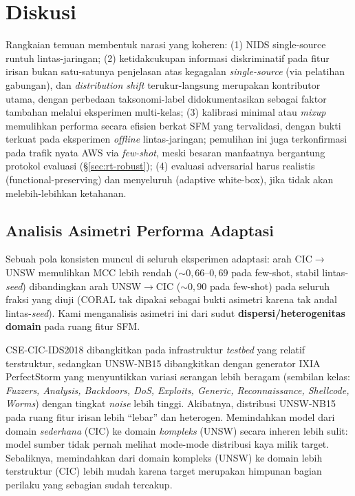 \documentclass[11pt,a4paper]{article}
\begin{document}
\section{Diskusi}
\label{sec:discussion}

Rangkaian temuan membentuk narasi yang koheren:
(1) NIDS single-source runtuh lintas-jaringan;
(2) ketidakcukupan informasi diskriminatif pada fitur irisan bukan satu-satunya
penjelasan atas kegagalan \emph{single-source} (via pelatihan gabungan), dan
\emph{distribution shift} terukur-langsung merupakan kontributor utama, dengan
perbedaan taksonomi-label didokumentasikan sebagai faktor tambahan melalui
eksperimen multi-kelas;
(3) kalibrasi minimal atau \emph{mixup} memulihkan performa secara efisien
berkat SFM yang tervalidasi, dengan bukti terkuat pada eksperimen \emph{offline}
lintas-jaringan; pemulihan ini juga terkonfirmasi pada trafik nyata AWS via
\emph{few-shot}, meski besaran manfaatnya bergantung protokol evaluasi
(\S\ref{sec:rt-robust})\ifadversarial;
(4) evaluasi adversarial harus realistis (functional-preserving) dan
menyeluruh (adaptive white-box), jika tidak akan melebih-lebihkan ketahanan\fi.

\subsection{Analisis Asimetri Performa Adaptasi}
\label{sec:asymmetry}
Sebuah pola konsisten muncul di seluruh eksperimen adaptasi: arah
CIC$\rightarrow$UNSW memulihkan MCC lebih rendah
($\sim 0{,}66$--$0{,}69$ pada few-shot, stabil lintas-\emph{seed}) dibandingkan arah
UNSW$\rightarrow$CIC ($\sim 0{,}90$ pada few-shot) pada seluruh fraksi yang diuji
(CORAL tak dipakai sebagai bukti asimetri karena tak andal lintas-\emph{seed}). Kami menganalisis asimetri ini dari sudut
\textbf{dispersi/heterogenitas domain} pada ruang fitur SFM.

CSE-CIC-IDS2018 dibangkitkan pada infrastruktur \emph{testbed} yang relatif
terstruktur, sedangkan UNSW-NB15 dibangkitkan dengan generator IXIA
PerfectStorm yang menyuntikkan variasi serangan lebih beragam
(sembilan kelas: \emph{Fuzzers, Analysis, Backdoors, DoS, Exploits, Generic,
Reconnaissance, Shellcode, Worms}) dengan tingkat \emph{noise} lebih tinggi.
Akibatnya, distribusi UNSW-NB15 pada ruang fitur irisan lebih ``lebar'' dan
heterogen. Memindahkan model dari domain \emph{sederhana} (CIC) ke domain
\emph{kompleks} (UNSW) secara inheren lebih sulit: model sumber tidak pernah
melihat mode-mode distribusi kaya milik target. Sebaliknya, memindahkan dari
domain kompleks (UNSW) ke domain lebih terstruktur (CIC) lebih mudah karena
target merupakan himpunan bagian perilaku yang sebagian sudah tercakup.
\end{document}
